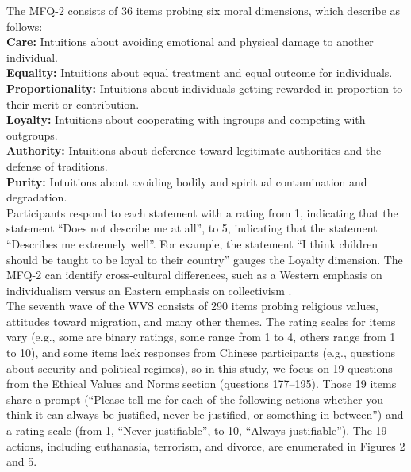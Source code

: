 \documentclass[11pt,a4paper]{article}
\begin{document}
The MFQ-2 consists of 36 items probing six moral dimensions, which \citealp{atari2023morality} describe as follows:\\

\noindent\textbf{Care:} Intuitions about avoiding emotional and physical damage to another individual.\\
\textbf{Equality:} Intuitions about equal treatment and equal outcome for individuals.\\
\textbf{Proportionality:} Intuitions about individuals getting rewarded in proportion to their merit or
contribution.\\
\textbf{Loyalty:} Intuitions about cooperating with ingroups and competing with outgroups.\\
\textbf{Authority:} Intuitions about deference toward legitimate authorities and the defense of
traditions.\\
\textbf{Purity:} Intuitions about avoiding bodily and spiritual contamination and degradation.\\

\noindent Participants respond to each statement with a rating from 1, indicating that the statement “Does not describe me at all”, to 5, indicating that the statement “Describes me extremely well”. For example, the statement “I think children should be taught to be loyal to their country” gauges the Loyalty dimension. The MFQ-2 can identify cross-cultural differences, such as a Western emphasis on individualism versus an Eastern emphasis on collectivism \cite{atari2023morality}.\\
\indent The seventh wave of the WVS consists of 290 items probing religious values, attitudes toward migration, and many other themes. The rating scales for items vary (e.g., some are binary ratings, some range from 1 to 4, others range from 1 to 10), and some items lack responses from Chinese participants (e.g., questions about security and political regimes), so in this study, we focus on 19 questions from the Ethical Values and Norms section (questions 177–195). Those 19 items share a prompt (“Please tell me for each of the following actions whether you think it can always be justified, never be justified, or something in between”) and a rating scale (from 1, “Never justifiable”, to 10, “Always justifiable”). The 19 actions, including euthanasia, terrorism, and divorce, are enumerated in Figures 2 and 5.
\end{document}
